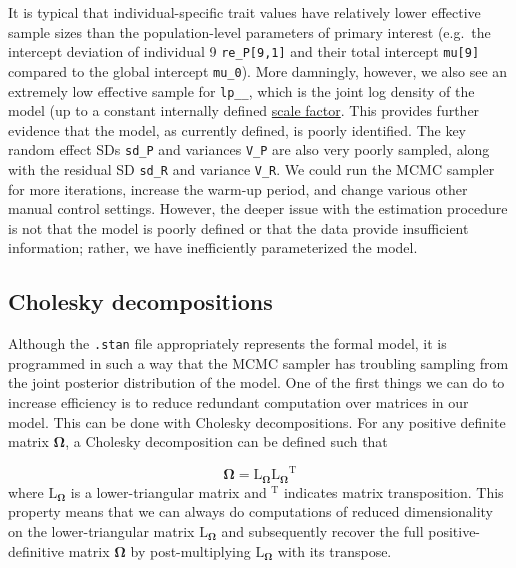 \documentclass[
]{book}
\newenvironment{Shaded}{\begin{snugshade}}{\end{snugshade}}
\newcommand{\KeywordTok}[1]{\textcolor[rgb]{0.13,0.29,0.53}{\textbf{#1}}}
\newcommand{\NormalTok}[1]{#1}
\newcommand{\OperatorTok}[1]{\textcolor[rgb]{0.81,0.36,0.00}{\textbf{#1}}}
\newcommand{\StringTok}[1]{\textcolor[rgb]{0.31,0.60,0.02}{#1}}
\begin{document}
\begin{Shaded}
\end{Shaded}

It is typical that individual-specific trait values have relatively lower effective sample sizes than the population-level parameters of primary interest (e.g.~the intercept deviation of individual 9 \texttt{re\_P{[}9,1{]}} and their total intercept \texttt{mu{[}9{]}} compared to the global intercept \texttt{mu\_0}). More damningly, however, we also see an extremely low effective sample for \texttt{lp\_\_}, which is the joint log density of the model (up to a constant internally defined \href{https://www.jax.org/news-and-insights/jax-blog/2015/october/lp-in-stan-output\#}{scale factor}. This provides further evidence that the model, as currently defined, is poorly identified. The key random effect SDs \texttt{sd\_P} and variances \texttt{V\_P} are also very poorly sampled, along with the residual SD \texttt{sd\_R} and variance \texttt{V\_R}. We could run the MCMC sampler for more iterations, increase the warm-up period, and change various other manual control settings. However, the deeper issue with the estimation procedure is not that the model is poorly defined or that the data provide insufficient information; rather, we have inefficiently parameterized the model.

\hypertarget{cholesky-decompositions}{%
\subsection{Cholesky decompositions}\label{cholesky-decompositions}}

Although the \texttt{.stan} file appropriately represents the formal model, it is programmed in such a way that the MCMC sampler has troubling sampling from the joint posterior distribution of the model. One of the first things we can do to increase efficiency is to reduce redundant computation over matrices in our model. This can be done with Cholesky decompositions. For any positive definite matrix \(\boldsymbol{\Omega}\), a Cholesky decomposition can be defined such that

\[\boldsymbol{\Omega} = \boldsymbol{\mathrm{L}_{\Omega}} \boldsymbol{\mathrm{L}_{\Omega}}^{\mathrm{T}}\]
where \(\boldsymbol{\mathrm{L}_{\Omega}}\) is a lower-triangular matrix and \(^{\mathrm{T}}\) indicates matrix transposition. This property means that we can always do computations of reduced dimensionality on the lower-triangular matrix \(\boldsymbol{\mathrm{L}_{\Omega}}\) and subsequently recover the full positive-definitive matrix \(\boldsymbol{\Omega}\) by post-multiplying \(\boldsymbol{\mathrm{L}_{\Omega}}\) with its transpose.
\end{document}
